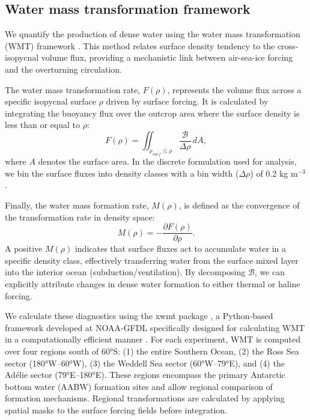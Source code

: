 \documentclass[pdflatex,sn-nature]{sn-jnl}
\begin{document}
\subsection{Water mass transformation framework}

We quantify the production of dense water using the water mass transformation (WMT) framework \cite{Walin1982,Speer1992}. This method relates surface density tendency to the cross-isopycnal volume flux, providing a mechanistic link between air-sea-ice forcing and the overturning circulation.

The water mass transformation rate, $F(\rho)$, represents the volume flux across a specific isopycnal surface $\rho$ driven by surface forcing. It is calculated by integrating the buoyancy flux over the outcrop area where the surface density is less than or equal to $\rho$:
\begin{equation}
F(\rho) = \iint_{\rho_{surf} \le \rho} \frac{\mathcal{B}}{\Delta \rho} \, dA,
\end{equation}
where $A$ denotes the surface area. In the discrete formulation used for analysis, we bin the surface fluxes into density classes with a bin width ($\Delta \rho$) of 0.2 kg m$^{-3}$.

Finally, the water mass formation rate, $M(\rho)$, is defined as the convergence of the transformation rate in density space:
\begin{equation}
M(\rho) = - \frac{\partial F(\rho)}{\partial \rho}.
\end{equation}
A positive $M(\rho)$ indicates that surface fluxes act to accumulate water in a specific density class, effectively transferring water from the surface mixed layer into the interior ocean (subduction/ventilation). By decomposing $\mathcal{B}$, we can explicitly attribute changes in dense water formation to either thermal or haline forcing.

We calculate these diagnostics using the xwmt package \cite{xwmt2024}, a Python-based framework developed at NOAA-GFDL specifically designed for calculating WMT in a computationally efficient manner \cite{drake2025water}. For each experiment, WMT is computed over four regions south of 60°S: (1) the entire Southern Ocean, (2) the Ross Sea sector (180°W--60°W), (3) the Weddell Sea sector (60°W--79°E), and (4) the Adélie sector (79°E--180°E). These regions encompass the primary Antarctic bottom water (AABW) formation sites and allow regional comparison of formation mechanisms. Regional transformations are calculated by applying spatial masks to the surface forcing fields before integration.
\end{document}
